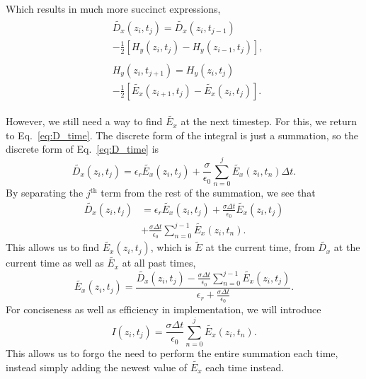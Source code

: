 \documentclass[12pt,twocolumn]{article}
\begin{document}
Which results in much more succinct expressions,
\begin{subequations}
\begin{align}
\label{eq:third_discrete_dD_dt}\begin{split}
&\tilde{D_x}(z_i,t_{j})=\tilde{D_x}(z_i,t_{j-1}) \\
&   -\frac{1}{2}\left[H_y(z_{i},t_j)-H_y(z_{i-1},t_j)\right],
\end{split} \\
\label{eq:third_discrete_dH_dt}\begin{split}
&H_y(z_i,t_{j+1}) =H_y(z_i,t_{j}) \\
    & -\frac{1}{2}\left[\tilde{E_x}(z_{i+1},t_j)-\tilde{E_x}(z_{i},t_j)\right].
\end{split}
\end{align}
\end{subequations}

 However, we still need a way to find $\tilde{E_x}$ at the next timestep. For this, we return to Eq.~\ref{eq:D_time}. The discrete form of the integral is just a summation, so the discrete form of Eq.~\ref{eq:D_time} is
\begin{equation}
\label{eq:first_discrete_D_time}\tilde{D_x}(z_i,t_j)=\epsilon_r\tilde{E_x}(z_i,t_j)+\frac{\sigma}{\epsilon_0}\sum_{n=0}^{j}\tilde{E_x}(z_i,t_n)\Delta t.
\end{equation}
By separating the $j^\mathrm{th}$ term from the rest of the summation, we see that
\begin{equation}
\begin{split}
\label{eq:second_discrete_D_time}\tilde{D_x}(z_i,t_j)&=\epsilon_r\tilde{E_x}(z_i,t_j)+ \frac{\sigma\Delta t}{\epsilon_0}\tilde{E_x}(z_i,t_j) \\
&+\frac{\sigma\Delta t}{\epsilon_0}\sum_{n=0}^{j-1}\tilde{E_x}(z_i,t_n).
\end{split}
\end{equation}
This allows us to find $\tilde{E_x}(z_i,t_j)$, which is $\tilde{E}$ at the current time, from $\tilde{D_x}$ at the current time as well as $\tilde{E_x}$ at all past times,
\begin{equation}
\label{eq:first_discrete_E}
\tilde{E_x}(z_i,t_j) = \frac{\tilde{D_x}(z_i,t_j)-\frac{\sigma\Delta t}{\epsilon_0}\sum_{n=0}^{j-1}\tilde{E_x}(z_i,t_j)}{\epsilon_r+\frac{\sigma\Delta t}{\epsilon_0}}.
\end{equation}
For conciseness as well as efficiency in implementation, we will introduce
\begin{equation}
\label{eq:first_I}
I(z_i,t_j) = \frac{\sigma\Delta t}{\epsilon_0}\sum_{n=0}^{j}\tilde{E_x}(z_i,t_n).
\end{equation}
This allows us to forgo the need to perform the entire summation each time, instead simply adding the newest value of $\tilde{E_x}$ each time instead.
\end{document}
